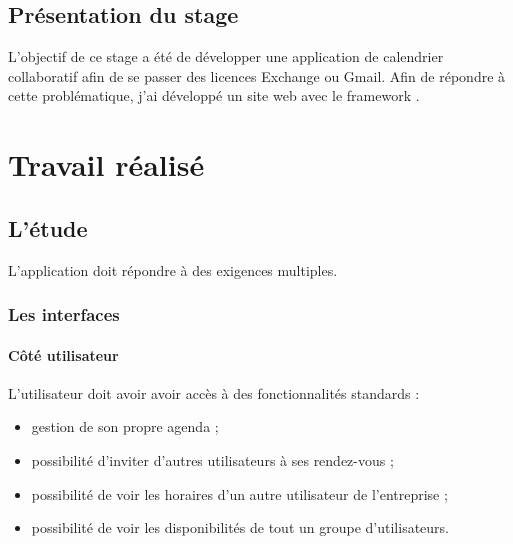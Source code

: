 \documentclass[a4paper, 11pt]{report}
\begin{document}
\chapter{Présentation du stage}
L'objectif de ce stage a été de développer une application de calendrier collaboratif afin de se passer des licences Exchange ou Gmail. Afin de répondre à cette problématique, j'ai développé un site web avec le framework \php \symfony.

\part{Travail réalisé}
\chapter{L'étude}
L'application doit répondre à des exigences multiples.
    \section{Les interfaces}
        \subsection{Côté utilisateur}
        L'utilisateur doit avoir avoir accès à des fonctionnalités standards :
        \begin{itemize}
            \item gestion de son propre agenda ;
            \item possibilité d'inviter d'autres utilisateurs à ses rendez-vous ;
            \item possibilité de voir les horaires d'un autre utilisateur de l'entreprise ;
            \item possibilité de voir les disponibilités de tout un groupe d'utilisateurs.
        \end{itemize}
\end{document}
